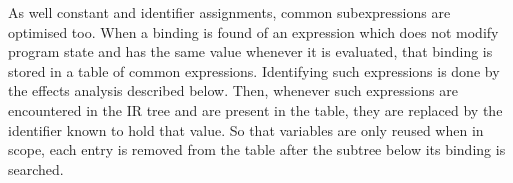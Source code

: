 
As well constant and identifier assignments, common subexpressions are optimised too. When a binding is found of an expression which does not modify program state and has the same value whenever it is evaluated, that binding is stored in a table of common expressions. Identifying such expressions is done by the effects analysis described below. Then, whenever such expressions are encountered in the IR tree and are present in the table, they are replaced by the identifier known to hold that value. So that variables are only reused when in scope, each entry is removed from the table after the subtree below its binding is searched.

